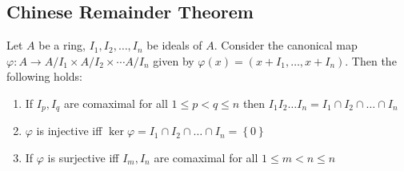 \subsection{Chinese Remainder Theorem}

\begin{theorem}
    Let $A$ be a ring, $I_1 , I_2 , \ldots , I_n$ be ideals of $A$. Consider the canonical map $\varphi : A \to A/I_1 \times A/I_2 \times \cdots A/I_n$ given by $\varphi \left( x \right) = \left( x+I_1 , \ldots , x+I_n \right)$. Then the following holds:
    \begin{enumerate}
	\item If $I_p , I_q$ are comaximal for all $1 \le p < q \le n$ then $I_1 I_2 \ldots I_n = I_1 \cap I_2 \cap \ldots \cap I_n$
	\item $\varphi$ is injective iff $\ker \varphi = I_1 \cap I_2 \cap \ldots \cap I_n = \left\{ 0 \right\}$
	\item If $\varphi$ is surjective iff $I_m , I_n$ are comaximal for all $1\le m < n \le n$
    \end{enumerate}
    \label{thm:CRT}
\end{theorem}

